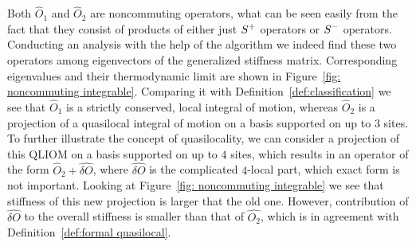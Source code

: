 Both \(\hat{O}_1\) and \(\hat{O}_2\) are noncommuting operators, what can be seen easily from the
fact that they consist of products of either just \(S^{+}\) operators or \(S^{-}\) operators. Conducting
an analysis with the help of the algorithm we indeed find these two operators among eigenvectors
of the generalized stiffness matrix. Corresponding eigenvalues and their thermodynamic limit
are shown in Figure~\ref{fig: noncommuting integrable}. Comparing it with 
Definition~\ref{def:classification} we see that \(\hat{O}_1\) is a strictly 
conserved, local integral of motion, whereas \(\hat{O}_2\) is a projection 
of a quasilocal integral of motion on a basis supported on up to \(3\) sites.
To further illustrate the concept of quasilocality, we can consider a projection
of this QLIOM on a basis supported on up to \(4\) sites, which results in an operator of the form 
\(\hat{O}_2 + \hat{\delta O}\), where \(\hat{\delta O}\) is the complicated \(4\)-local part,
which exact form is not important. Looking at Figure~\ref{fig: noncommuting integrable} we see
that stiffness of this new projection is larger that the old one. However, contribution 
of \(\hat{\delta O}\) to the overall stiffness is smaller than that of \(\hat{O_2}\), which
is in agreement with Definition~\ref{def:formal quasilocal}.
